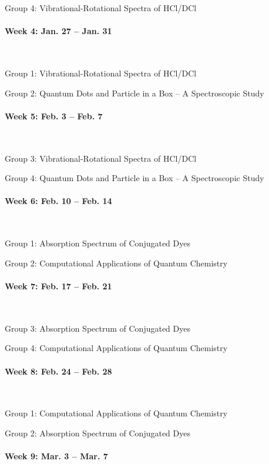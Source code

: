 \documentclass[12pt, letterpaper]{article}
\begin{document}
Group 4: Vibrational-Rotational Spectra of HCl/DCl

\paragraph{Week 4: Jan. 27 -- Jan. 31}~

Group 1: Vibrational-Rotational Spectra of HCl/DCl

Group 2: Quantum Dots and Particle in a Box – A Spectroscopic Study
\paragraph{Week 5: Feb. 3 -- Feb. 7}~

Group 3: Vibrational-Rotational Spectra of HCl/DCl

Group 4: Quantum Dots and Particle in a Box – A Spectroscopic Study

\paragraph{Week 6: Feb. 10 -- Feb. 14}~

Group 1: Absorption Spectrum of Conjugated Dyes

Group 2: Computational Applications of Quantum Chemistry

\paragraph{Week 7: Feb. 17 -- Feb. 21}~

Group 3: Absorption Spectrum of Conjugated Dyes

Group 4: Computational Applications of Quantum Chemistry

\paragraph{Week 8: Feb. 24 -- Feb. 28}~

Group 1: Computational Applications of Quantum Chemistry

Group 2: Absorption Spectrum of Conjugated Dyes

\paragraph{Week 9: Mar. 3 -- Mar. 7}~
\end{document}
